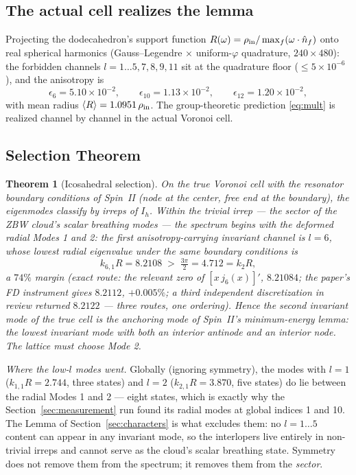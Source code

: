 \documentclass[12pt]{article}
\newtheorem{theorem}{Theorem}
\begin{document}
\subsection{The actual cell realizes the lemma}
\label{sec:content}

Projecting the dodecahedron's support function
$R(\omega) = \rho_{\rm in}/\max_f(\omega\cdot\hat n_f)$ onto real
spherical harmonics (Gauss--Legendre $\times$ uniform-$\varphi$
quadrature, $240\times480$): the forbidden channels $l = 1\ldots5, 7,
8, 9, 11$ sit at the quadrature floor ($\le 5\times10^{-6}$), and the
anisotropy is
\begin{equation}
\epsilon_6 = 5.10\times10^{-2},\qquad
\epsilon_{10} = 1.13\times10^{-2},\qquad
\epsilon_{12} = 1.20\times10^{-2},
\label{eq:eps}
\end{equation}
with mean radius $\langle R\rangle = 1.0951\,\rho_{\rm in}$.  The
group-theoretic prediction \eqref{eq:mult} is realized channel by
channel in the actual Voronoi cell.

\subsection{Selection Theorem}
\label{sec:selection}

\begin{theorem}[Icosahedral selection]
On the true Voronoi cell with the resonator boundary conditions of
Spin~II (node at the center, free end at the boundary), the eigenmodes
classify by irreps of $I_h$.  Within the \emph{trivial} irrep --- the
sector of the ZBW cloud's scalar breathing modes --- the spectrum
begins with the deformed radial Modes 1 and 2: the first
anisotropy-carrying invariant channel is $l = 6$, whose lowest radial
eigenvalue under the same boundary conditions is
\begin{equation}
k_{6,1}R = 8.2108 \;>\; \tfrac{3\pi}{2} = 4.712 = k_2 R,
\end{equation}
a $74\%$ margin (exact route: the relevant zero of $[x\,j_6(x)]'$,
$8.21084$; the paper's FD instrument gives $8.2112$, $+0.005\%$; a
third independent discretization in review returned $8.2122$ --- three
routes, one ordering).  Hence the second invariant mode of the true cell
\emph{is} the anchoring mode of Spin~II's minimum-energy lemma: the
lowest invariant mode with both an interior antinode and an interior
node.  The lattice must choose Mode 2.
\end{theorem}

\noindent\emph{Where the low-$l$ modes went.}  Globally (ignoring
symmetry), the modes with $l = 1$ ($k_{1,1}R = 2.744$, three states)
and $l = 2$ ($k_{2,1}R = 3.870$, five states) do lie between the radial
Modes 1 and 2 --- eight states, which is exactly why the
Section~\ref{sec:measurement} run found its radial modes at global
indices 1 and 10.  The Lemma of Section~\ref{sec:characters} is what
excludes them: no $l = 1\ldots5$ content can appear in any invariant
mode, so the interlopers live entirely in non-trivial irreps and cannot
serve as the cloud's scalar breathing state.  Symmetry does not remove
them from the spectrum; it removes them from the \emph{sector}.
\end{document}
